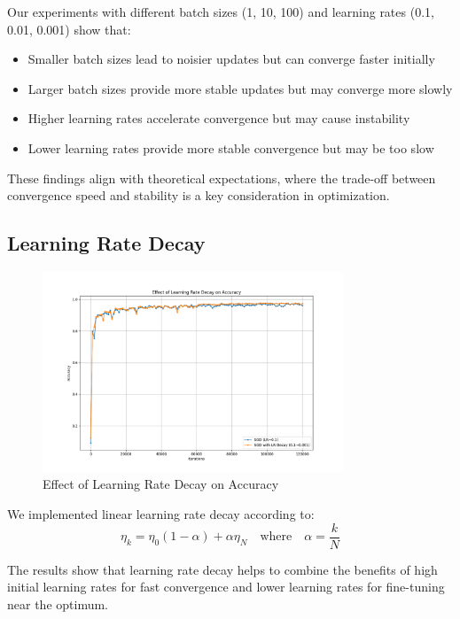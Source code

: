 \documentclass{article}
\begin{document}
Our experiments with different batch sizes (1, 10, 100) and learning rates (0.1, 0.01, 0.001) show that:

\begin{itemize}
    \item Smaller batch sizes lead to noisier updates but can converge faster initially
    \item Larger batch sizes provide more stable updates but may converge more slowly
    \item Higher learning rates accelerate convergence but may cause instability
    \item Lower learning rates provide more stable convergence but may be too slow
\end{itemize}

These findings align with theoretical expectations, where the trade-off between convergence speed and stability is a key consideration in optimization.

\subsection{Learning Rate Decay}
\begin{figure}[h]
\centering
\includegraphics[width=0.8\textwidth]{plots/part2b_lr_decay_accuracy.png}
\caption{Effect of Learning Rate Decay on Accuracy}
\end{figure}

We implemented linear learning rate decay according to:
\begin{equation}
\eta_k = \eta_0(1-\alpha) + \alpha\eta_N \quad \text{where} \quad \alpha = \frac{k}{N}
\end{equation}

The results show that learning rate decay helps to combine the benefits of high initial learning rates for fast convergence and lower learning rates for fine-tuning near the optimum.
\end{document}
